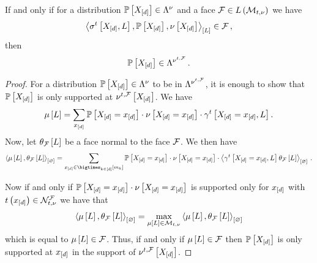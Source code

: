 \begin{lemma}
    \label{lem:faceMeasureRepCondition} %
    If and only if for a distribution $\mathbb{P}\left[X_{[d]}\right]\in\Lambda^{\nu}$ and a face $\mathcal{F}\in L\left(\mathcal{M}_{t,\nu}\right)$ we have
    \begin{align*}
        \left\langle \sigma^{t}\left[X_{[d]},L\right],\mathbb{P}\left[X_{[d]}\right],\nu\left[X_{[d]}\right]\right\rangle_{\left[ L \right]}\in\mathcal{F}\, ,
    \end{align*}
    then %
    \begin{align*}
        \mathbb{P}\left[X_{[d]}\right] \in \Lambda^{\nu^{t,\mathcal{F}}} \, .
    \end{align*}
\end{lemma}
\begin{proof}
    For a distribution $\mathbb{P}\left[X_{[d]}\right]\in\Lambda^{\nu}$ to be in $\Lambda^{\nu^{t,\mathcal{F}}}$, it is enough to show that $\mathbb{P}\left[X_{[d]}\right]$ is only supported at $\nu^{t,\mathcal{F}}\left[X_{[d]}\right]$.
    We have
    \begin{align*}
        \mu\left[L\right]
        = \sum_{x_{[d]}} \mathbb{P}\left[X_{[d]}=x_{[d]}\right]\cdot\nu\left[X_{[d]}=x_{[d]}\right] \cdot \gamma^{t}\left[X_{[d]}=x_{[d]},L\right] .
    \end{align*}
    Now, let $\theta_{\mathcal{F}}\left[L\right]$ be a face normal to the face $\mathcal{F}$.
    We then have
    \begin{align*}
        \contraction{\meanparamwith,\canparamofat{\facesymbol}{\selvariable}}
        = \sum_{\shortcatindicesin}
        \probat{\indexedshortcatvariables}\cdot\basemeasureat{\indexedshortcatvariables} \cdot \contraction{\genstatshortcatencoding,\canparamofat{\facesymbol}{\selvariable}} \, .
    \end{align*}

    Now if and only if $\mathbb{P}\left[X_{[d]}=x_{[d]}\right]\cdot\nu\left[X_{[d]}=x_{[d]}\right]$ is supported only for $x_{[d]}$ with $t\left(x_{[d]}\right)\in\mathcal{N}_{t,\nu}^{\mathcal{F}}$ we have that
    \begin{align*}
        \left\langle \mu\left[L\right],\theta_{\mathcal{F}}\left[L\right]\right\rangle_{\left[ \varnothing \right]}
        = \max_{\mu\left[L\right]\in\mathcal{M}_{t,\nu}} \left\langle \mu\left[L\right],\theta_{\mathcal{F}}\left[L\right]\right\rangle_{\left[ \varnothing \right]}
    \end{align*}
    which is equal to $\mu\left[L\right]\in\mathcal{F}$.
    Thus, if and only if $\mu\left[L\right]\in\mathcal{F}$ then $\mathbb{P}\left[X_{[d]}\right]$ is only supported at $x_{[d]}$ in the support of $\nu^{t,\mathcal{F}}\left[X_{[d]}\right]$.
\end{proof}

